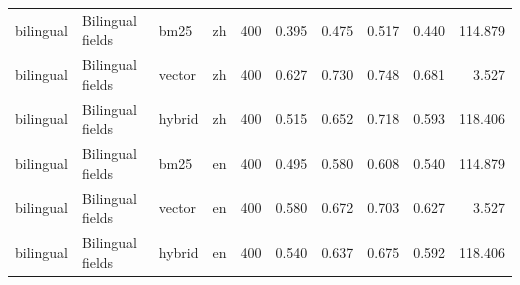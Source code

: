 \begin{tabular}{llllrrrrrr}
bilingual & Bilingual fields & bm25 & zh & 400 & 0.395 & 0.475 & 0.517 & 0.440 & 114.879 \\
bilingual & Bilingual fields & vector & zh & 400 & 0.627 & 0.730 & 0.748 & 0.681 & 3.527 \\
bilingual & Bilingual fields & hybrid & zh & 400 & 0.515 & 0.652 & 0.718 & 0.593 & 118.406 \\
bilingual & Bilingual fields & bm25 & en & 400 & 0.495 & 0.580 & 0.608 & 0.540 & 114.879 \\
bilingual & Bilingual fields & vector & en & 400 & 0.580 & 0.672 & 0.703 & 0.627 & 3.527 \\
bilingual & Bilingual fields & hybrid & en & 400 & 0.540 & 0.637 & 0.675 & 0.592 & 118.406 \\
\bottomrule
\end{tabular}
